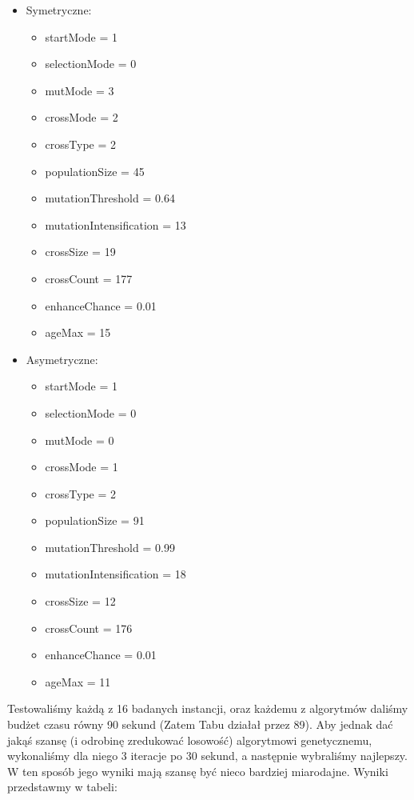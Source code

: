 \documentclass{article}
\begin{document}
\begin{itemize}
	\item Symetryczne:
		\begin{itemize}
			\item startMode = 1
			\item selectionMode = 0
			\item mutMode = 3
			\item crossMode = 2
			\item crossType = 2
			\item populationSize = 45
			\item mutationThreshold = 0.64
			\item mutationIntensification = 13
			\item crossSize = 19
			\item crossCount = 177
    		\item enhanceChance = 0.01
    		\item ageMax = 15
		\end{itemize}
	\item Asymetryczne:
		\begin{itemize}
			\item startMode = 1
			\item selectionMode = 0
			\item mutMode = 0
			\item crossMode = 1
			\item crossType = 2
    		\item populationSize = 91
    		\item mutationThreshold = 0.99
			\item mutationIntensification = 18
			\item crossSize = 12
			\item crossCount = 176
    		\item enhanceChance = 0.01
    		\item ageMax = 11
		\end{itemize}
\end{itemize}
Testowaliśmy każdą z 16 badanych instancji, oraz każdemu z algorytmów daliśmy budżet czasu równy 90 sekund (Zatem Tabu działał przez 89). Aby jednak dać jakąś szansę (i odrobinę zredukować losowość) algorytmowi genetycznemu, wykonaliśmy dla niego 3 iteracje po 30 sekund, a następnie wybraliśmy najlepszy. W ten sposób jego wyniki mają szansę być nieco bardziej miarodajne. Wyniki przedstawmy w tabeli:
\end{document}
